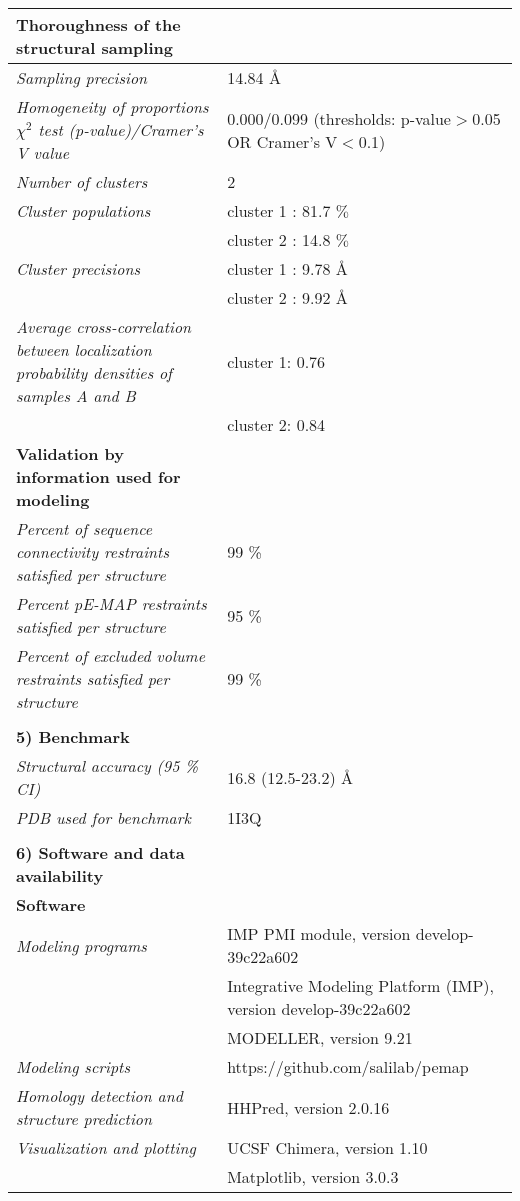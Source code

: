 \documentclass[8pt,a4paper]{article}
\begin{document}
\begin{longtable}{ p{} | p{} }
    \textbf{Thoroughness of the structural sampling} & \\
    \hline
          \textit{Sampling precision} & 14.84 \AA \\
                \textit{Homogeneity of proportions $\chi^2$ test (p-value)/Cramer’s V value} & 0.000/0.099 (thresholds: p-value$>$0.05 OR Cramer's V$<$0.1)\\
                \textit{Number of clusters} & 2\\
                \textit{Cluster populations} & cluster 1 : 81.7 $\%$\\
            & cluster 2 : 14.8 $\%$ \\
                \textit{Cluster precisions} & cluster 1 : 9.78 \AA\\
            & cluster 2 : 9.92 \AA \\
                \textit{Average cross-correlation between localization probability densities of samples A and B} & cluster 1: 0.76\\
            & cluster 2: 0.84 \\
           \hline
  
  \textbf{Validation by information used for modeling} & \\
  \hline
          \textit{Percent of sequence connectivity restraints satisfied per structure} & 99 \%\\
                \textit{Percent pE-MAP restraints satisfied per structure} & 95 \%\\
                \textit{Percent of excluded volume restraints satisfied per structure} & 99 \%\\
          &  \\
  
  \textbf{5) Benchmark} & \\
  \hline
          \textit{Structural accuracy (95 \% CI)} & 16.8 (12.5-23.2) \AA\\
                \textit{PDB used for benchmark} & 1I3Q\\
          
   &  \\
  \normalsize{\textbf{6) Software and data availability}} & \\
    \hline
   \textbf{Software} & \\
   \hline
             \textit{Modeling programs} & IMP PMI module, version develop-39c22a602\\
             & Integrative Modeling Platform (IMP), version develop-39c22a602 \\
             & MODELLER, version 9.21 \\
                  \textit{Modeling scripts} & https://github.com/salilab/pemap\\
                  \textit{Homology detection and structure prediction} & HHPred, version 2.0.16\\
                  \textit{Visualization and plotting} & UCSF Chimera, version 1.10\\
             & Matplotlib, version 3.0.3  \\
          \hline


\end{longtable}
\end{document}
